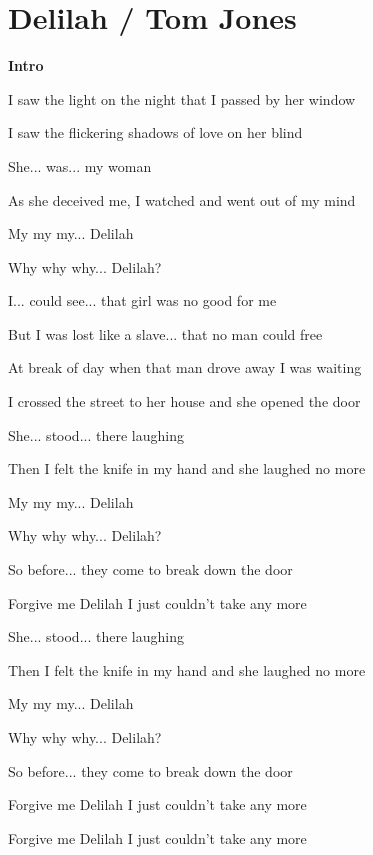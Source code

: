 \section{Delilah / Tom Jones}\label{sec:delilah}
\Eminor
\Bseven
\EmajorEasy
\Eseven
\Aminor
\Dseven
\Gmajor
\Gseven
\Cmajor
\Aseven


\textbf{Intro} 

I saw the light on the night that I passed by her window

I saw the flickering shadows of love on her blind

She... was... my woman

As she deceived me, I watched and went out of my mind


My my my... Delilah

Why why why... Delilah?

I... could see... that girl was no good for me

But I was lost like a slave... that no man could free 

At break of day when that man drove away I was waiting

I crossed the street to her house and she opened the door

She... stood... there laughing

Then I felt the knife in my hand and she laughed no more


My my my... Delilah

Why why why... Delilah?

So before... they come to break down the door

Forgive me Delilah I just couldn’t take any more 

   

She... stood... there laughing

Then I felt the knife in my hand and she laughed no more


My my my... Delilah

Why why why... Delilah?

So before... they come to break down the door

Forgive me Delilah I just couldn’t take any more

Forgive me Delilah I just couldn’t take any more 



